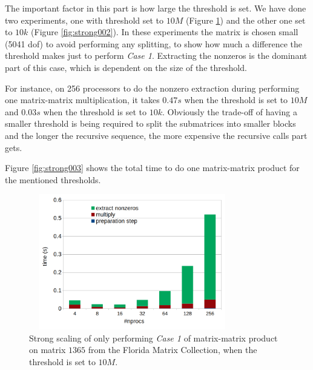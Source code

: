 
The important factor in this part is how large the threshold is set. We have done two experiments, one with threshold set to $10M$ (Figure \ref{fig:strong001}) and the other one set to $10k$ (Figure \ref{fig:strong002}). In these experiments the matrix is chosen small (5041 dof) to avoid performing any splitting, to show how much a difference the threshold makes just to perform \textit{Case 1}. Extracting the nonzeros is the dominant part of this case, which is dependent on the size of the threshold.

For instance, on 256 processors to do the nonzero extraction during performing one matrix-matrix multiplication, it takes $0.47s$ when the threshold is set to $10M$ and $0.03s$ when the threshold is set to $10k$. Obviously the trade-off of having a smaller threshold is being required to split the submatrices into smaller blocks and the longer the recursive sequence, the more expensive the recursive calls part gets.

Figure \ref{fig:strong003} shows the total time to do one matrix-matrix product for the mentioned thresholds.

\newpage

\begin{figure}[htbp]
    \includegraphics[width=9cm,height=5.9cm]{./figures/strong001.png}
    \caption{Strong scaling of only performing \textit{Case 1} of matrix-matrix product on matrix $1365$ from the Florida Matrix Collection, when the threshold is set to $10M$.}
    \label{fig:strong001}
\end{figure}



